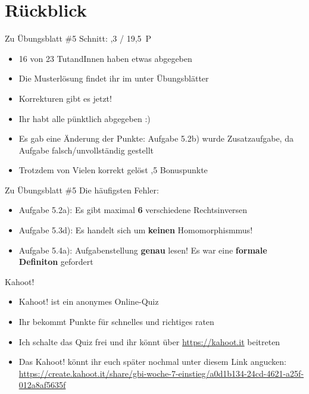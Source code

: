 \section{Rückblick}

\begin{frame}{Zu Übungsblatt \#5}
	Schnitt: ,3 / 19,5~P

	\begin{itemize}[<+->]
		\item 16 von 23 TutandInnen haben etwas abgegeben
		\item Die Musterlösung findet ihr im \ILIAS unter Übungsblätter
		\item Korrekturen gibt es jetzt!
		\item Ihr habt alle pünktlich abgegeben :)
		\item Es gab eine Änderung der Punkte: Aufgabe 5.2b) wurde Zusatzaufgabe, da Aufgabe falsch/unvollständig gestellt
		\item[] Trotzdem von Vielen korrekt gelöst ,5 Bonuspunkte
	\end{itemize}
\end{frame}

\begin{frame}{Zu Übungsblatt \#5}
	Die häufigsten Fehler:
	\begin{itemize}[<+->]
		\item Aufgabe 5.2a): Es gibt maximal \textbf{6} verschiedene Rechtsinversen
		\item Aufgabe 5.3d): Es handelt sich um \textbf{keinen} Homomorphismmus!
		\item Aufgabe 5.4a): Aufgabenstellung \textbf{genau} lesen! Es war eine \textbf{formale Definiton} gefordert
	\end{itemize}
\end{frame}

\framePrevEpisode
\begin{frame}{Kahoot!}
	\begin{itemize}[<+->]
		\item Kahoot! ist ein anonymes Online-Quiz
		\item Ihr bekommt Punkte für schnelles und richtiges raten
		\item Ich schalte das Quiz frei und ihr könnt über \url{https://kahoot.it} beitreten
		\item Das Kahoot! könnt ihr euch später nochmal unter diesem Link angucken: \\
			\url{https://create.kahoot.it/share/gbi-woche-7-einstieg/a0d1b134-24cd-4621-a25f-012a8af5635f}
	\end{itemize}
\end{frame}


